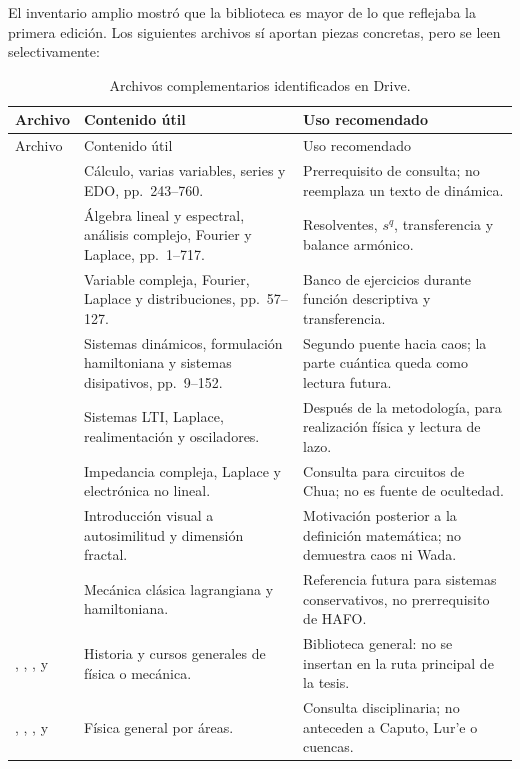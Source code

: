 El inventario amplio mostró que la biblioteca es mayor de lo que reflejaba la
primera edición. Los siguientes archivos sí aportan piezas concretas, pero se
leen selectivamente:

\begin{longtable}{@{}L{5.25cm}L{4.1cm}L{4.65cm}@{}}
\caption{Archivos complementarios identificados en Drive.}
\label{tab:drive-complementarios}\\
\toprule
Archivo & Contenido útil & Uso recomendado \\
\midrule
\endfirsthead
\toprule
Archivo & Contenido útil & Uso recomendado \\
\midrule
\endhead
{} &
Cálculo, varias variables, series y EDO, pp.\ 243--760. &
Prerrequisito de consulta; no reemplaza un texto de dinámica. \\
 &
Álgebra lineal y espectral, análisis complejo, Fourier y Laplace,
pp.\ 1--717. &
Resolventes, \(s^q\), transferencia y balance armónico. \\
 &
Variable compleja, Fourier, Laplace y distribuciones, pp.\ 57--127. &
Banco de ejercicios durante función descriptiva y transferencia. \\
 &
Sistemas dinámicos, formulación hamiltoniana y sistemas disipativos,
pp.\ 9--152. &
Segundo puente hacia caos; la parte cuántica queda como lectura futura. \\
 &
Sistemas LTI, Laplace, realimentación y osciladores. &
Después de la metodología, para realización física y lectura de lazo. \\
 &
Impedancia compleja, Laplace y electrónica no lineal. &
Consulta para circuitos de Chua; no es fuente de ocultedad. \\
 &
Introducción visual a autosimilitud y dimensión fractal. &
Motivación posterior a la definición matemática; no demuestra caos ni Wada. \\
 &
Mecánica clásica lagrangiana y hamiltoniana. &
Referencia futura para sistemas conservativos, no prerrequisito de HAFO. \\
,
,
,
 y
 &
Historia y cursos generales de física o mecánica. &
Biblioteca general: no se insertan en la ruta principal de la tesis. \\
, ,
,  y
 &
Física general por áreas. &
Consulta disciplinaria; no anteceden a Caputo, Lur'e o cuencas. \\
\bottomrule
\end{longtable}

